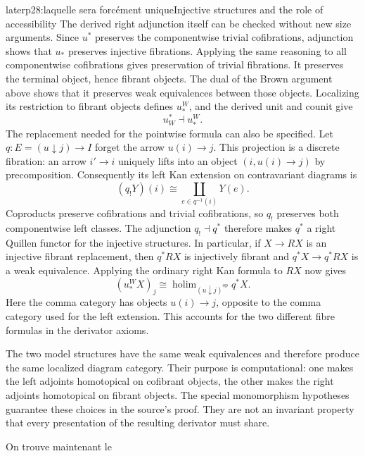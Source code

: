 \begin{dcomment}{later}{p28:laquelle sera forcément unique}{Injective structures and the role of accessibility}
The derived right adjunction itself can be checked without new size arguments. Since $u^*$ preserves the componentwise trivial cofibrations, adjunction shows that $u_*$ preserves injective fibrations. Applying the same reasoning to all componentwise cofibrations gives preservation of trivial fibrations. It preserves the terminal object, hence fibrant objects. The dual of the Brown argument above shows that it preserves weak equivalences between those objects. Localizing its restriction to fibrant objects defines $u_*^W$, and the derived unit and counit give
\[
 u_W^*\dashv u_*^W.
\]
The replacement needed for the pointwise formula can also be specified. Let $q:E=(u\downarrow j)\to I$ forget the arrow $u(i)\to j$. This projection is a discrete fibration: an arrow $i'\to i$ uniquely lifts into an object $(i,u(i)\to j)$ by precomposition. Consequently its left Kan extension on contravariant diagrams is
\[
 (q_!Y)(i)\cong\coprod_{e\in q^{-1}(i)}Y(e).
\]
Coproducts preserve cofibrations and trivial cofibrations, so $q_!$ preserves both componentwise left classes. The adjunction $q_!\dashv q^*$ therefore makes $q^*$ a right Quillen functor for the injective structures. In particular, if $X\to RX$ is an injective fibrant replacement, then $q^*RX$ is injectively fibrant and $q^*X\to q^*RX$ is a weak equivalence. Applying the ordinary right Kan formula to $RX$ now gives
\[
 (u_*^WX)_j\cong
 \operatorname{holim}_{(u\downarrow j)^{\mathrm{op}}}q^*X.
\]
Here the comma category has objects $u(i)\to j$, opposite to the comma category used for the left extension. This accounts for the two different fibre formulas in the derivator axioms.

The two model structures have the same weak equivalences and therefore produce the same localized diagram category. Their purpose is computational: one makes the left adjoints homotopical on cofibrant objects, the other makes the right adjoints homotopical on fibrant objects. The special monomorphism hypotheses guarantee these choices in the source's proof. They are not an invariant property that every presentation of the resulting derivator must share.
\end{dcomment}


On trouve maintenant le

